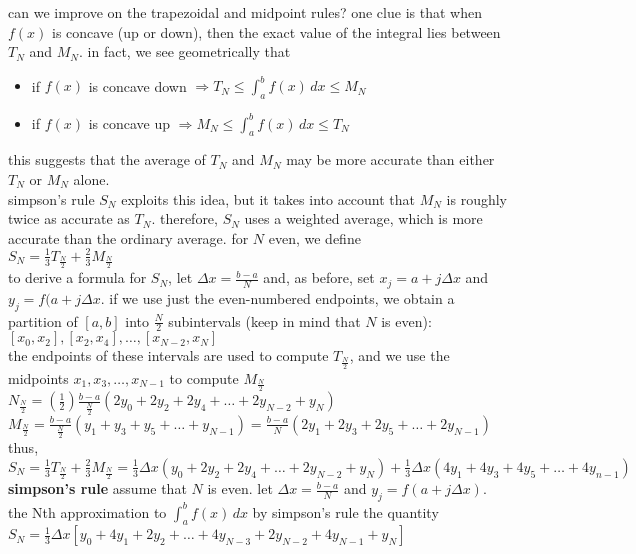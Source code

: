 \documentclass{article}
\begin{document}
can we improve on the trapezoidal and midpoint rules? one clue is that when $f(x)$ is concave (up or down), then the exact value of the integral lies between $T_N$ and $M_N$. in fact, we see geometrically that
	\begin{itemize}
		\item if $f(x)$ is concave down $\Rightarrow T_N \leq \int_{a}^{b}f(x)\,dx \leq M_N$
		\item if $f(x)$ is concave up $\Rightarrow M_N \leq \int_{a}^{b}f(x)\,dx \leq T_N$ 
	\end{itemize}
this suggests that the average of $T_N$ and $M_N$ may be more accurate than either $T_N$ or $M_N$ alone.\\ simpson's rule $S_N$ exploits this idea, but it takes into account that $M_N$ is roughly twice as accurate as $T_N$. therefore, $S_N$ uses a weighted average, which is more accurate than the ordinary average. for $N$ even, we define\\ $S_N = \frac{1}{3}T_{\frac{N}{2}} + \frac{2}{3}M_{\frac{N}{2}}$\\ to derive a formula for $S_N$, let $\Delta x = \frac{b - a}{N}$ and, as before, set $x_j = a + j\Delta x$ and $y_j = f(a + j\Delta x$. if we use just the even-numbered endpoints, we obtain a partition of $[a, b]$ into $\frac{N}{2}$ subintervals (keep in mind that $N$ is even):\\ $[x_0, x_2], [x_2, x_4], \ldots, [x_{N-2}, x_N]$\\ the endpoints of these intervals are used to compute $T_{\frac{N}{2}}$, and we use the midpoints $x_1, x_3, \ldots, x_{N-1}$ to compute $M_{\frac{N}{2}}$\\
$N_{\frac{N}{2}} = (\frac{1}{2})\frac{b - a}{\frac{N}{2}}(2y_0 + 2y_2 + 2y_4 + \ldots + 2y_{N-2} + y_N)$\\
$M_{\frac{N}{2}} = \frac{b - a}{\frac{N}{2}}(y_1 + y_3 + y_5 + \ldots + y_{N-1}) = \frac{b - a}{N}(2y_1 + 2y_3 + 2y_5 + \ldots + 2y_{N-1})$\\
thus,\\
$S_N = \frac{1}{3}T_{\frac{N}{2}} + \frac{2}{3}M_{\frac{N}{2}} = \frac{1}{3}\Delta x(y_0 + 2y_2 + 2y_4 + \ldots + 2y_{N-2} + y_N) + \frac{1}{3}\Delta x(4y_1 + 4y_3 + 4y_5 + \ldots + 4y_{n-1})$\\

\textbf{simpson's rule} assume that $N$ is even. let $\Delta x = \frac{b - a}{N}$ and $y_j = f(a + j\Delta x)$.\\
the Nth approximation to $\int_{a}^{b}f(x)\,dx$ by simpson's rule the quantity\\
$S_N = \frac{1}{3}\Delta x[y_0 + 4y_1 + 2y_2 + \ldots + 4y_{N-3} + 2y_{N-2} + 4y_{N-1} + y_N]$\\
\end{document}
